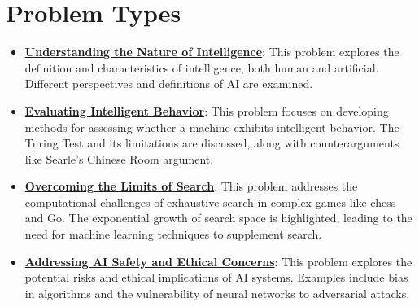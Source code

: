 \documentclass{article}%
\begin{document}
\section{Problem Types}%
\label{sec:ProblemTypes}%
\begin{itemize}[leftmargin=*]%
\item \href{https://purdue.brightspace.com/d2l/common/assets/pdfjs-d2l-dist/1.0.14-legacy/web/viewer.html?file=\%2Fcontent\%2Fenforced\%2F1095467-wl.202510.CS.24300.001\%2F02L2-Intro.pdf\%3Fou\%3D1095467\&lang=en-us\&container=d2l-fileviewer-rendered-pdf\&fullscreen=d2l-fileviewer-rendered-pdf-dialog\&height=667#page=5}{\textbf{Understanding the Nature of Intelligence}}: This problem explores the definition and characteristics of intelligence, both human and artificial. Different perspectives and definitions of AI are examined.%
\item \href{https://purdue.brightspace.com/d2l/common/assets/pdfjs-d2l-dist/1.0.14-legacy/web/viewer.html?file=\%2Fcontent\%2Fenforced\%2F1095467-wl.202510.CS.24300.001\%2F02L2-Intro.pdf\%3Fou\%3D1095467\&lang=en-us\&container=d2l-fileviewer-rendered-pdf\&fullscreen=d2l-fileviewer-rendered-pdf-dialog\&height=667#page=6}{\textbf{Evaluating Intelligent Behavior}}: This problem focuses on developing methods for assessing whether a machine exhibits intelligent behavior. The Turing Test and its limitations are discussed, along with counterarguments like Searle's Chinese Room argument.%
\item \href{https://purdue.brightspace.com/d2l/common/assets/pdfjs-d2l-dist/1.0.14-legacy/web/viewer.html?file=\%2Fcontent\%2Fenforced\%2F1095467-wl.202510.CS.24300.001\%2F02L2-Intro.pdf\%3Fou\%3D1095467\&lang=en-us\&container=d2l-fileviewer-rendered-pdf\&fullscreen=d2l-fileviewer-rendered-pdf-dialog\&height=667#page=11}{\textbf{Overcoming the Limits of Search}}: This problem addresses the computational challenges of exhaustive search in complex games like chess and Go. The exponential growth of search space is highlighted, leading to the need for machine learning techniques to supplement search.%
\item \href{https://purdue.brightspace.com/d2l/common/assets/pdfjs-d2l-dist/1.0.14-legacy/web/viewer.html?file=\%2Fcontent\%2Fenforced\%2F1095467-wl.202510.CS.24300.001\%2F02L2-Intro.pdf\%3Fou\%3D1095467\&lang=en-us\&container=d2l-fileviewer-rendered-pdf\&fullscreen=d2l-fileviewer-rendered-pdf-dialog\&height=667#page=19}{\textbf{Addressing AI Safety and Ethical Concerns}}: This problem explores the potential risks and ethical implications of AI systems. Examples include bias in algorithms and the vulnerability of neural networks to adversarial attacks.%

\end{itemize}
\end{document}
